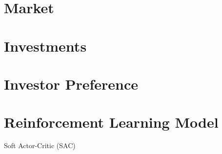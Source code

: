 \section{Market}
\section{Investments}
\section{Investor Preference}
\section{Reinforcement Learning Model}
Soft Actor-Critic (SAC)\cite{haarnoja2018soft}